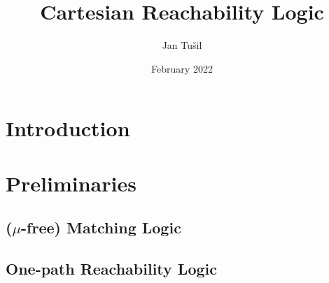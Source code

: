 \documentclass{article}
\title{Cartesian Reachability Logic}
\author{Jan Tušil }
\date{February 2022}
\begin{document}
\maketitle

\section{Introduction}

\section{Preliminaries}

\subsection{($\mu$-free) Matching Logic}

\subsection{One-path Reachability Logic}
\end{document}

